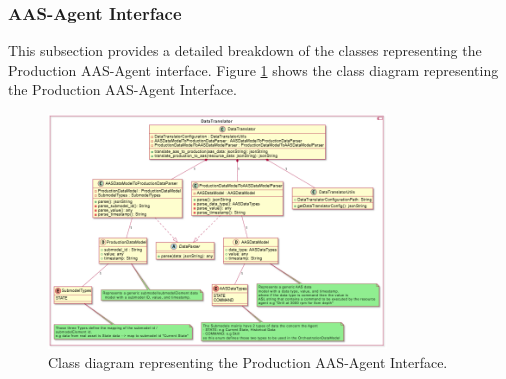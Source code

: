 \subsubsection{AAS-Agent Interface}
This subsection provides a detailed breakdown of the classes representing the Production AAS-Agent interface.
Figure \ref{fig:prod_aas_agent_Translator_classes} shows the class diagram representing the Production AAS-Agent Interface.
\begin{figure}[ht]
    \centering  
    \includegraphics[width=0.8\textwidth]{Images/Production_Classes/Translator.png}
    \caption{Class diagram representing the Production AAS-Agent Interface.}
    \label{fig:prod_aas_agent_Translator_classes}
\end{figure}

